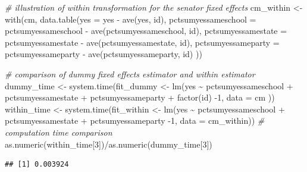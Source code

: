 \documentclass[
  12pt,
]{style/krantz}
\newenvironment{Shaded}{\begin{snugshade}}{\end{snugshade}}
\newcommand{\AttributeTok}[1]{\textcolor[rgb]{0.77,0.63,0.00}{#1}}
\newcommand{\CommentTok}[1]{\textcolor[rgb]{0.56,0.35,0.01}{\textit{#1}}}
\newcommand{\DecValTok}[1]{\textcolor[rgb]{0.00,0.00,0.81}{#1}}
\newcommand{\FunctionTok}[1]{\textcolor[rgb]{0.00,0.00,0.00}{#1}}
\newcommand{\NormalTok}[1]{#1}
\newcommand{\OtherTok}[1]{\textcolor[rgb]{0.56,0.35,0.01}{#1}}
\newcommand{\SpecialCharTok}[1]{\textcolor[rgb]{0.00,0.00,0.00}{#1}}
\begin{document}
\begin{Shaded}
\begin{Highlighting}[]
\CommentTok{\# illustration of within transformation for the senator fixed effects}
\NormalTok{cm\_within }\OtherTok{\textless{}{-}} 
  \FunctionTok{with}\NormalTok{(cm, }\FunctionTok{data.table}\NormalTok{(}\AttributeTok{yes =}\NormalTok{ yes }\SpecialCharTok{{-}} \FunctionTok{ave}\NormalTok{(yes, id),}
                      \AttributeTok{pctsumyessameschool =}\NormalTok{ pctsumyessameschool }\SpecialCharTok{{-}} \FunctionTok{ave}\NormalTok{(pctsumyessameschool, id),}
                      \AttributeTok{pctsumyessamestate =}\NormalTok{ pctsumyessamestate }\SpecialCharTok{{-}} \FunctionTok{ave}\NormalTok{(pctsumyessamestate, id),}
                      \AttributeTok{pctsumyessameparty =}\NormalTok{ pctsumyessameparty }\SpecialCharTok{{-}} \FunctionTok{ave}\NormalTok{(pctsumyessameparty, id)}
\NormalTok{                      ))}

\CommentTok{\# comparison of dummy fixed effects estimator and within estimator}
\NormalTok{dummy\_time }\OtherTok{\textless{}{-}} \FunctionTok{system.time}\NormalTok{(fit\_dummy }\OtherTok{\textless{}{-}} 
              \FunctionTok{lm}\NormalTok{(yes }\SpecialCharTok{\textasciitilde{}}\NormalTok{ pctsumyessameschool }\SpecialCharTok{+} 
\NormalTok{                           pctsumyessamestate }\SpecialCharTok{+}\NormalTok{ pctsumyessameparty }\SpecialCharTok{+} \FunctionTok{factor}\NormalTok{(id) }\SpecialCharTok{{-}}\DecValTok{1}\NormalTok{, }\AttributeTok{data =}\NormalTok{ cm}
\NormalTok{                         ))}
\NormalTok{within\_time }\OtherTok{\textless{}{-}} \FunctionTok{system.time}\NormalTok{(fit\_within }\OtherTok{\textless{}{-}} 
                             \FunctionTok{lm}\NormalTok{(yes }\SpecialCharTok{\textasciitilde{}}\NormalTok{ pctsumyessameschool }\SpecialCharTok{+} 
\NormalTok{                           pctsumyessamestate }\SpecialCharTok{+}\NormalTok{ pctsumyessameparty }\SpecialCharTok{{-}}\DecValTok{1}\NormalTok{, }\AttributeTok{data =}\NormalTok{ cm\_within))}
\CommentTok{\# computation time comparison}
\FunctionTok{as.numeric}\NormalTok{(within\_time[}\DecValTok{3}\NormalTok{])}\SpecialCharTok{/}\FunctionTok{as.numeric}\NormalTok{(dummy\_time[}\DecValTok{3}\NormalTok{])}
\end{Highlighting}
\end{Shaded}

\begin{verbatim}
## [1] 0.003924
\end{verbatim}
\end{document}
